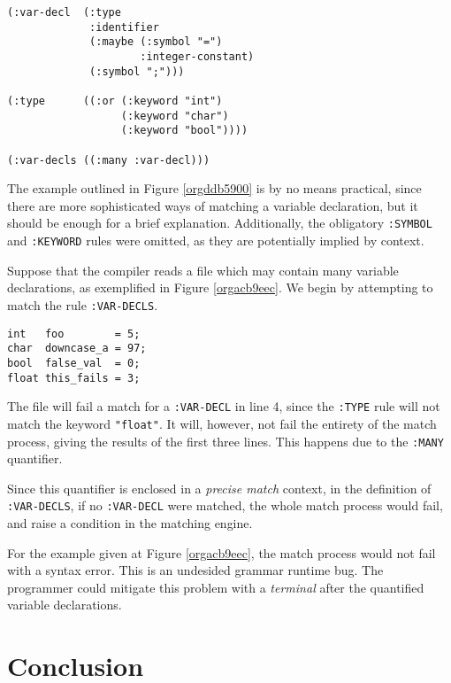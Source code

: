 \documentclass[a4paper,11pt,oneside]{article}
\begin{document}
\begin{verbatim}
(:var-decl  (:type
             :identifier
             (:maybe (:symbol "=")
                     :integer-constant)
             (:symbol ";")))

(:type      ((:or (:keyword "int")
                  (:keyword "char")
                  (:keyword "bool"))))

(:var-decls ((:many :var-decl)))
\end{verbatim}
\hfill \break

The example outlined in Figure \ref{orgddb5900} is by no means
practical, since there are more sophisticated ways of matching a
variable declaration, but it should be enough for a brief
explanation. Additionally, the obligatory \texttt{:SYMBOL} and \texttt{:KEYWORD} rules
were omitted, as they are potentially implied by context.

Suppose that the compiler reads a file which may contain many variable
declarations, as exemplified in Figure \ref{orgacb9eec}. We begin by
attempting to match the rule \texttt{:VAR-DECLS}.

\begin{verbatim}
int   foo        = 5;
char  downcase_a = 97;
bool  false_val  = 0;
float this_fails = 3;
\end{verbatim}
\hfill \break

The file will fail a match for a \texttt{:VAR-DECL} in line 4, since the \texttt{:TYPE}
rule will not match the keyword \texttt{"float"}. It will, however, not fail
the entirety of the match process, giving the results of the first
three lines. This happens due to the \texttt{:MANY} quantifier.

Since this quantifier is enclosed in a \emph{precise match} context, in the
definition of \texttt{:VAR-DECLS}, if no \texttt{:VAR-DECL} were matched, the whole
match process would fail, and raise a condition in the matching
engine.

For the example given at Figure \ref{orgacb9eec}, the match process would
not fail with a syntax error. This is an undesided grammar runtime
bug. The programmer could mitigate this problem with a \emph{terminal} after
the quantified variable declarations.

\section{Conclusion}
\label{sec:org27bf87f}
\end{document}
